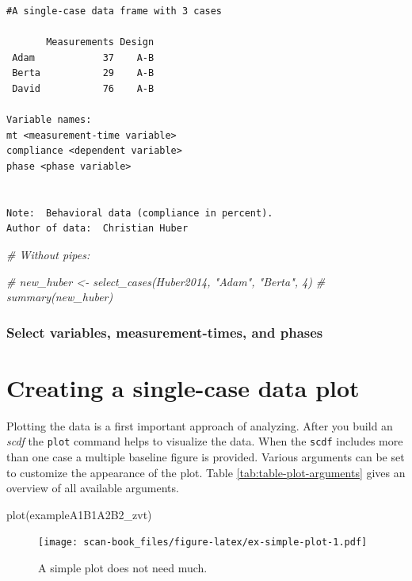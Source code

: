 \documentclass[
]{book}
\newenvironment{Shaded}{\begin{snugshade}}{\end{snugshade}}
\newcommand{\CommentTok}[1]{\textcolor[rgb]{0.56,0.35,0.01}{\textit{#1}}}
\newcommand{\FunctionTok}[1]{\textcolor[rgb]{0.00,0.00,0.00}{#1}}
\newcommand{\NormalTok}[1]{#1}
\begin{document}
\begin{verbatim}
#A single-case data frame with 3 cases

       Measurements Design
 Adam            37    A-B
 Berta           29    A-B
 David           76    A-B

Variable names:
mt <measurement-time variable>
compliance <dependent variable>
phase <phase variable>


Note:  Behavioral data (compliance in percent).
Author of data:  Christian Huber 
\end{verbatim}

\begin{Shaded}
\begin{Highlighting}[]
\CommentTok{\# Without pipes:}

\CommentTok{\# new\_huber \textless{}{-} select\_cases(Huber2014, "Adam", "Berta", 4)}
\CommentTok{\# summary(new\_huber)}
\end{Highlighting}
\end{Shaded}

\hypertarget{select-variables-measurement-times-and-phases}{%
\subsection{Select variables, measurement-times, and phases}\label{select-variables-measurement-times-and-phases}}

\hypertarget{creating-a-single-case-data-plot}{%
\chapter{Creating a single-case data plot}\label{creating-a-single-case-data-plot}}

Plotting the data is a first important approach of analyzing. After you build an \emph{scdf} the \texttt{plot} command helps to visualize the data. When the \texttt{scdf} includes more than one case a multiple baseline figure is provided. Various arguments can be set to customize the appearance of the plot. Table \ref{tab:table-plot-arguments} gives an overview of all available arguments.

\begin{Shaded}
\begin{Highlighting}[]
\FunctionTok{plot}\NormalTok{(exampleA1B1A2B2\_zvt)}
\end{Highlighting}
\end{Shaded}

\begin{figure}
\centering
\texttt{[image: scan-book\_files/figure-latex/ex-simple-plot-1.pdf]}
\caption{\label{fig:ex-simple-plot}A simple plot does not need much.}
\end{figure}
\end{document}
